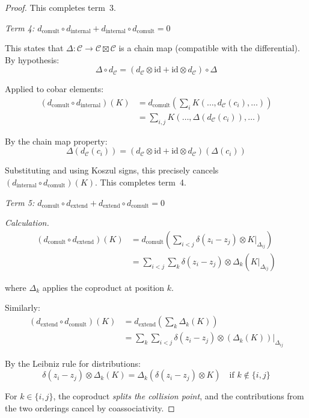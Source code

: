 \begin{proof}
This completes term~3.

\emph{Term 4: $d_{\text{comult}} \circ d_{\text{internal}} + d_{\text{internal}}
\circ d_{\text{comult}} = 0$}

This states that $\Delta: \mathcal{C} \to \mathcal{C} \boxtimes \mathcal{C}$ is a
chain map (compatible with the differential). By hypothesis:
\[\Delta \circ d_{\mathcal{C}} = (d_{\mathcal{C}} \otimes \text{id} + \text{id}
\otimes d_{\mathcal{C}}) \circ \Delta\]

Applied to cobar elements:
\begin{align*}
(d_{\text{comult}} \circ d_{\text{internal}})(K) &= d_{\text{comult}}\left(\sum_i
K(\ldots, d_{\mathcal{C}}(c_i), \ldots)\right) \\
&= \sum_{i,j} K(\ldots, \Delta(d_{\mathcal{C}}(c_i)), \ldots)
\end{align*}

By the chain map property:
\[\Delta(d_{\mathcal{C}}(c_i)) = (d_{\mathcal{C}} \otimes \text{id} + \text{id}
\otimes d_{\mathcal{C}})(\Delta(c_i))\]

Substituting and using Koszul signs, this precisely cancels $(d_{\text{internal}}
\circ d_{\text{comult}})(K)$. This completes term~4.

\emph{Term 5: $d_{\text{comult}} \circ d_{\text{extend}} + d_{\text{extend}}
\circ d_{\text{comult}} = 0$}

\emph{Calculation.}
\begin{align*}
(d_{\text{comult}} \circ d_{\text{extend}})(K) &= d_{\text{comult}}\left(\sum_{i<j}
\delta(z_i - z_j) \otimes K|_{\Delta_{ij}}\right) \\
&= \sum_{i<j} \sum_k \delta(z_i - z_j) \otimes \Delta_k(K|_{\Delta_{ij}})
\end{align*}

where $\Delta_k$ applies the coproduct at position $k$.

Similarly:
\begin{align*}
(d_{\text{extend}} \circ d_{\text{comult}})(K) &= d_{\text{extend}}\left(\sum_k
\Delta_k(K)\right) \\
&= \sum_k \sum_{i<j} \delta(z_i - z_j) \otimes (\Delta_k(K))|_{\Delta_{ij}}
\end{align*}

By the Leibniz rule for distributions:
\[\delta(z_i - z_j) \otimes \Delta_k(K) = \Delta_k(\delta(z_i - z_j) \otimes K)
\quad \text{if } k \notin \{i, j\}\]

For $k \in \{i,j\}$, the coproduct \emph{splits the collision point}, and the
contributions from the two orderings cancel by coassociativity.


\end{proof}
